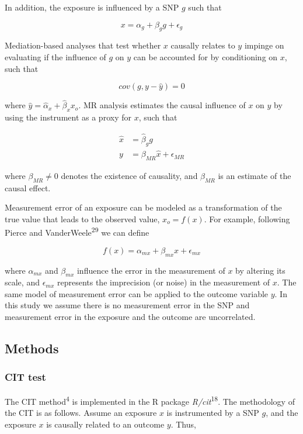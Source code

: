 \documentclass[]{article}
\begin{document}
In addition, the exposure is influenced by a SNP \(g\) such that

\[
x = \alpha_g + \beta_g g + \epsilon_g
\]

Mediation-based analyses that test whether \(x\) causally relates to
\(y\) impinge on evaluating if the influence of \(g\) on \(y\) can be
accounted for by conditioning on \(x\), such that

\[
cov(g, y - \hat{y}) = 0
\]

where \(\hat{y} = \hat{\alpha}_x + \hat{\beta}_x x_o\). MR analysis
estimates the causal influence of \(x\) on \(y\) by using the instrument
as a proxy for \(x\), such that

\[
\begin{aligned}
\hat{x} & = \hat{\beta}_g g \\
y & = \beta_{MR}\hat{x} + \epsilon_{MR}
\end{aligned}
\]

where \(\beta_{MR} \neq 0\) denotes the existence of causality, and
\(\beta_{MR}\) is an estimate of the causal effect.

Measurement error of an exposure can be modeled as a transformation of
the true value that leads to the observed value, \(x_o = f(x)\). For
example, following Pierce and VanderWeele\textsuperscript{29} we can
define

\[
f(x) = \alpha_{mx} + \beta_{mx} x + \epsilon_{mx}
\]

where \(\alpha_{mx}\) and \(\beta_{mx}\) influence the error in the
measurement of \(x\) by altering its scale, and \(\epsilon_{mx}\)
represents the imprecision (or noise) in the measurement of \(x\). The
same model of measurement error can be applied to the outcome variable
\(y\). In this study we assume there is no measurement error in the SNP
and measurement error in the exposure and the outcome are uncorrelated.

\subsection{Methods}\label{methods}

\subsubsection{CIT test}\label{cit-test}

The CIT method\textsuperscript{4} is implemented in the R package
\emph{R/cit}\textsuperscript{18}. The methodology of the CIT is as
follows. Assume an exposure \(x\) is instrumented by a SNP \(g\), and
the exposure \(x\) is causally related to an outcome \(y\). Thus,
\end{document}
